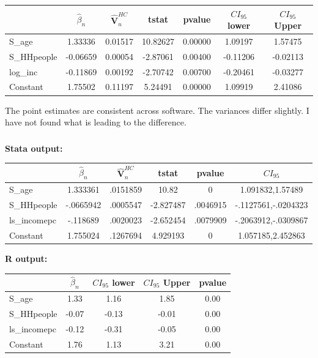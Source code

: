 \documentclass[12pt]{article}
\begin{document}
\begin{table}[ht]
\begin{tabular}{lcccccc}
  \hline
  &           $\hat \beta_n$&         $\mathbf{\hat V}_n^{HC}$ &           t\-stat &           p\-value &        $CI_{95}$ lower &  $CI_{95}$ Upper\\
  \hline
    S\_age & 1.33336 & 0.01517 & 10.82627 & 0.00000 & 1.09197 & 1.57475 \\
    S\_HHpeople & -0.06659 & 0.00054 & -2.87061 & 0.00400 & -0.11206 & -0.02113 \\
    log\_inc & -0.11869 & 0.00192 & -2.70742 & 0.00700 & -0.20461 & -0.03277 \\
  Constant & 1.75502 & 0.11197 & 5.24491 & 0.00000 & 1.09919 & 2.41086 \\
   \hline
\end{tabular}
\end{table}

The point estimates are consistent across software. The variances differ slightly. I have not found what is leading to the difference.

\newpage
\subsubsection{}
\textbf{Stata output:}\\


\begin{tabular}{lccccc}
 &           $\hat \beta_n$&         $\mathbf{\hat V}_n^{HC}$ &           t\-stat &           p\-value &        $CI_{95}$\\
\hline
S\_age       &    1.333361&    .0151859&       10.82&           0 &1.091832,1.57489\\
S\_HHpeople  &   -.0665942&    .0005547&   -2.827487&    .0046915&-.1127561,-.0204323\\
ls\_incomepc &    -.118689&    .0020023&   -2.652454&    .0079909&-.2063912,-.0309867\\
Constant       &    1.755024&    .1267694&    4.929193&    0 & 1.057185,2.452863\\
\hline
\end{tabular}

\textbf{R output:}\\


\begin{tabular}{lcccc}
  \hline
  & $\hat \beta_n$&  $CI_{95}$ lower &  $CI_{95}$ Upper & p\-value \\
   \hline
   S\_age & 1.33 & 1.16 & 1.85 & 0.00 \\
   S\_HHpeople & -0.07 & -0.13 & -0.01 & 0.00 \\
  ls\_incomepc & -0.12 & -0.31 & -0.05 & 0.00 \\
   Constant & 1.76 & 1.13 & 3.21 & 0.00 \\
    \hline
\end{tabular}
\end{document}
